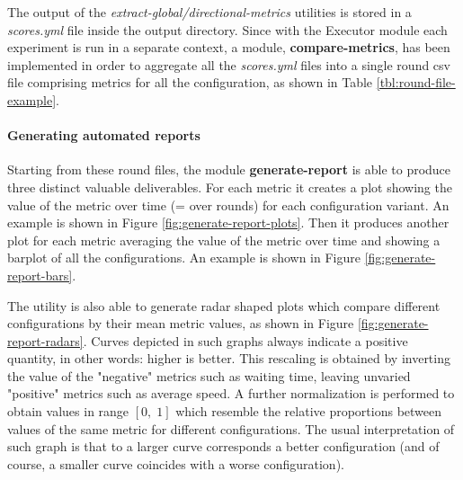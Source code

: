 The output of the \textit{extract-global/directional-metrics} utilities is stored in a \textit{scores.yml} file inside the output directory.
Since with the Executor module each experiment is run in a separate context, a module, \textbf{compare-metrics}, has been implemented in order to aggregate all the \textit{scores.yml} files into a single round csv file comprising metrics for all the configuration, as shown in Table \ref{tbl:round-file-example}.

\begin{table}[H]
  \label{tbl:round-file-example}
\end{table}

\paragraph{Generating automated reports}

Starting from these round files, the module \textbf{generate-report} is able to produce three distinct valuable deliverables.
For each metric it creates a plot showing the value of the metric over time (= over rounds) for each configuration variant.
An example is shown in Figure \ref{fig:generate-report-plots}.
Then it produces another plot for each metric averaging the value of the metric over time and showing a barplot of all the configurations.
An example is shown in Figure \ref{fig:generate-report-bars}.

The utility is also able to generate radar shaped plots which compare different configurations by their mean metric values, as shown in Figure \ref{fig:generate-report-radars}.
Curves depicted in such graphs always indicate a positive quantity, in other words: higher is better.
This rescaling is obtained by inverting the value of the "negative" metrics such as waiting time, leaving unvaried "positive" metrics such as average speed.
A further normalization is performed to obtain values in range $[0,\;1]$ which resemble the relative proportions between values of the same metric for different configurations.
The usual interpretation of such graph is that to a larger curve corresponds a better configuration (and of course, a smaller curve coincides with a worse configuration).

